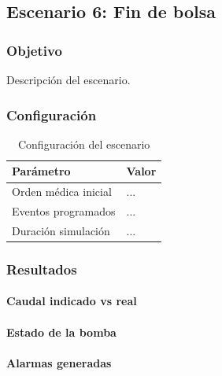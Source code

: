 \subsection{Escenario 6: Fin de bolsa}

\subsubsection{Objetivo}

Descripción del escenario.

\subsubsection{Configuración}

\begin{table}[H]
\centering
\begin{tabular}{ll}
\toprule
Parámetro & Valor \\
\midrule
Orden médica inicial & ... \\
Eventos programados & ... \\
Duración simulación & ... \\
\bottomrule
\end{tabular}
\caption{Configuración del escenario}
\end{table}

\subsubsection{Resultados}

\paragraph{Caudal indicado vs real}


\paragraph{Estado de la bomba}


\paragraph{Alarmas generadas}

